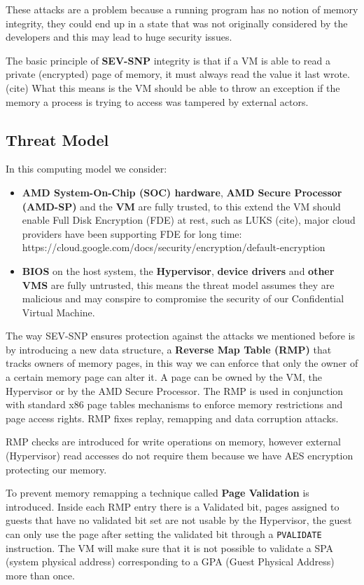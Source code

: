 \documentclass[twocolumn]{article}
\begin{document}
These attacks are a problem because a running program has no notion of memory integrity, they could end up in a state that was not originally considered by the developers and this may lead to huge security issues.

The basic principle of \textbf{SEV-SNP} integrity is that if a VM is able to read a private (encrypted) page of memory, it must always read the value it last wrote. (cite) What this means is the VM should be able to throw an exception if the memory a process is trying to access was tampered by external actors.

\subsection*{Threat Model}
In this computing model we consider:

\begin{itemize}
    \item \textbf{AMD System-On-Chip (SOC) hardware}, \textbf{AMD Secure Processor (AMD-SP)} and the \textbf{VM} are fully trusted, to this extend the VM should enable Full Disk Encryption (FDE) at rest, such as LUKS (cite), major cloud providers have been supporting FDE for long time:  https://cloud.google.com/docs/security/encryption/default-encryption
    \item \textbf{BIOS} on the host system, the \textbf{Hypervisor}, \textbf{device drivers} and \textbf{other VMS} are fully untrusted, this means the threat model assumes they are malicious and may conspire to compromise the security of our Confidential Virtual Machine.
\end{itemize}

The way SEV-SNP ensures protection against the attacks we mentioned before is by introducing a new data structure, a \textbf{Reverse Map Table (RMP)} that tracks owners of memory pages, in this way we can enforce that only the owner of a certain memory page can alter it. A page can be owned by the VM, the Hypervisor or by the AMD Secure Processor. The RMP is used in conjunction with standard x86 page tables mechanisms to enforce memory restrictions and page access rights. RMP fixes replay, remapping and data corruption attacks. 

RMP checks are introduced for write operations on memory, however external (Hypervisor) read accesses do not require them because we have AES encryption protecting our memory.

To prevent memory remapping a technique called \textbf{Page Validation} is introduced.
Inside each RMP entry there is a Validated bit, pages assigned to guests that have no validated bit set are not usable by the Hypervisor, the guest can only use the page after setting the validated bit through a \texttt{PVALIDATE} instruction. The VM will make sure that it is not possible to validate a SPA (system physical address) corresponding to a GPA (Guest Physical Address) more than once.
 
\end{document}
